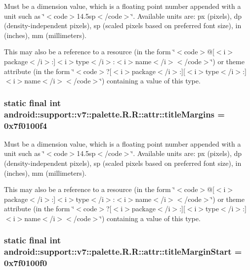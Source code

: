 Must be a dimension value, which is a floating point number appended with a unit such as \char`\"{}$<$code$>$14.5sp$<$/code$>$\char`\"{}. Available units are: px (pixels), dp (density-independent pixels), sp (scaled pixels based on preferred font size), in (inches), mm (millimeters). 

This may also be a reference to a resource (in the form \char`\"{}$<$code$>$@\mbox{[}$<$i$>$package$<$/i$>$:\mbox{]}$<$i$>$type$<$/i$>$:$<$i$>$name$<$/i$>$$<$/code$>$\char`\"{}) or theme attribute (in the form \char`\"{}$<$code$>$?\mbox{[}$<$i$>$package$<$/i$>$:\mbox{]}\mbox{[}$<$i$>$type$<$/i$>$:\mbox{]}$<$i$>$name$<$/i$>$$<$/code$>$\char`\"{}) containing a value of this type. \hypertarget{classandroid_1_1support_1_1v7_1_1palette_1_1_r_1_1attr_b0d87fab2a360fd3189cc45236139025}{
\subsubsection[{titleMargins}]{\setlength{\rightskip}{0pt plus 5cm}static final int android::support::v7::palette.R.R::attr::titleMargins = 0x7f0100f4}}
\label{classandroid_1_1support_1_1v7_1_1palette_1_1_r_1_1attr_b0d87fab2a360fd3189cc45236139025}


Must be a dimension value, which is a floating point number appended with a unit such as \char`\"{}$<$code$>$14.5sp$<$/code$>$\char`\"{}. Available units are: px (pixels), dp (density-independent pixels), sp (scaled pixels based on preferred font size), in (inches), mm (millimeters). 

This may also be a reference to a resource (in the form \char`\"{}$<$code$>$@\mbox{[}$<$i$>$package$<$/i$>$:\mbox{]}$<$i$>$type$<$/i$>$:$<$i$>$name$<$/i$>$$<$/code$>$\char`\"{}) or theme attribute (in the form \char`\"{}$<$code$>$?\mbox{[}$<$i$>$package$<$/i$>$:\mbox{]}\mbox{[}$<$i$>$type$<$/i$>$:\mbox{]}$<$i$>$name$<$/i$>$$<$/code$>$\char`\"{}) containing a value of this type. \hypertarget{classandroid_1_1support_1_1v7_1_1palette_1_1_r_1_1attr_37f631d103ec1b0fe455c0d22d539d79}{
\subsubsection[{titleMarginStart}]{\setlength{\rightskip}{0pt plus 5cm}static final int android::support::v7::palette.R.R::attr::titleMarginStart = 0x7f0100f0}}
\label{classandroid_1_1support_1_1v7_1_1palette_1_1_r_1_1attr_37f631d103ec1b0fe455c0d22d539d79}


